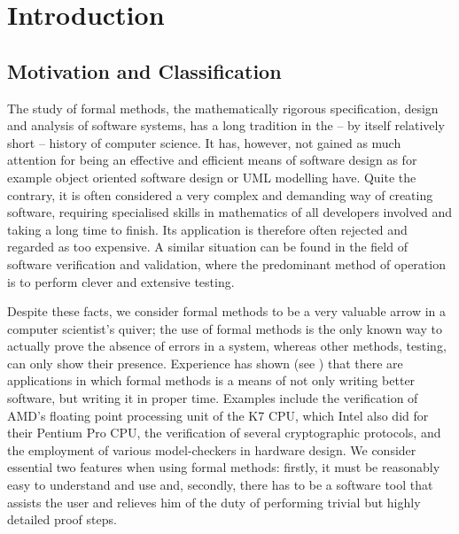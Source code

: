 

\chapter{Introduction}
\label{cha:introduction}


\section{Motivation and Classification}
\label{sec:motiv-class}

The study of formal methods, \IE the mathematically rigorous specification,
design and analysis of software systems, has a long tradition in the -- by
itself relatively short -- history of computer science. It has, however, not
gained as much attention for being an effective and efficient means of software
design as for example object oriented software design or UML \cite{Fowler04}
 modelling
have. Quite the contrary, it is often considered a very complex and demanding
way of creating software, requiring specialised skills in mathematics of all
developers involved and taking a long time to finish. Its application is
therefore often rejected and regarded as too expensive. A similar situation can
be found in the field of software verification and validation, where the
predominant method of operation is to perform clever and extensive testing.

Despite these facts, we consider formal methods to be a very valuable arrow in a
computer scientist's quiver; the use of formal methods is the only known way to
actually prove the absence of errors in a system, whereas other methods, \EG
testing, can only show their presence. Experience has shown (see
\cite{KuhnChandramouliButler02,SobelClarkson02}) that there are applications in
which formal methods is a means of not only writing better software, but writing
it in proper time. Examples include the verification of AMD's floating point
processing unit of the K7 CPU, which Intel also did for their Pentium Pro CPU,
the verification of several cryptographic protocols, and the employment of
various model-checkers in hardware design. We consider essential two features
when using formal methods: firstly, it must be reasonably easy to understand and
use and, secondly, there has to be a software tool that assists the user and
relieves him of the duty of performing trivial but highly detailed proof steps.

